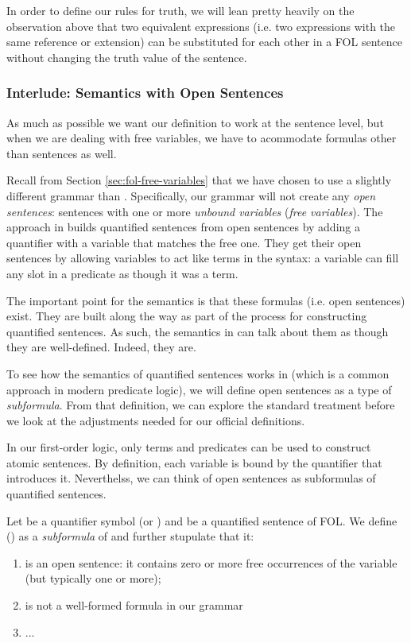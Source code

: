 In order to define our rules for truth, we will lean pretty heavily on the
observation above that two equivalent expressions (i.e. two expressions with
the same reference or extension) can be substituted for each other in a FOL
sentence without changing the truth value of the sentence.

\subsubsection{Interlude: Semantics with Open Sentences}

As much as possible we want our definition to work at the sentence level, but
when we are dealing with free variables, we have to acommodate formulas other
than sentences as well.

Recall from Section \ref{sec:fol-free-variables} that we have chosen to use a
slightly different grammar than \cite{Mag25}. Specifically, our grammar will
not create any \emph{open sentences}: sentences with one or more \emph{unbound
variables} (\emph{free variables}). The approach in \cite{Mag25} builds
quantified sentences from open sentences by adding a quantifier with a variable
that matches the free one. They get their open sentences by allowing variables
to act like terms in the syntax: a variable can fill any slot in a predicate as
though it was a term.

The important point for the semantics is that these formulas (i.e. open
sentences) exist. They are built along the way as part of the process for
constructing quantified sentences. As such, the semantics in \cite{Mag25} can
talk about them as though they are well-defined. Indeed, they are.

To see how the semantics of quantified sentences works in \cite{Mag25} (which is
a common approach in modern predicate logic), we will define open sentences as
a type of \emph{subformula}. From that definition, we can explore the standard
treatment before we look at the adjustments needed for our official definitions.

\begin{definition}
  In our first-order logic, only terms and predicates can be used to construct
  atomic sentences. By definition, each variable is bound by the quantifier
  that introduces it. Neverthelss, we can think of open sentences as subformulas
  of quantified sentences.

  Let \etheta be a quantifier symbol (\eforall or \eexists) and \etheta\exi\ephi
  be a quantified sentence of FOL. We define \ephi(\exi) as a \emph{subformula}
  of \etheta\exi\ephi and further stupulate that it:
  \begin{enumerate}
  \item is an open sentence: it contains zero or more free occurrences of the
    variable \exi (but typically one or more);
  \item is not a well-formed formula in our grammar
  \item ...
  \end{enumerate}
\end{definition}

